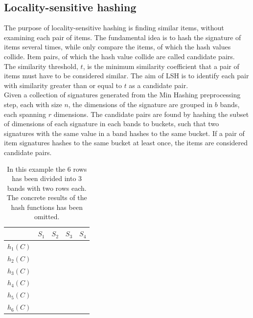 \subsection{Locality-sensitive hashing}
The purpose of locality-sensitive hashing is finding similar items, without examining each pair of items. The fundamental idea is to hash the signature of items several times, while only compare the items, of which the hash values collide. Item pairs, of which the hash value collide are called candidate pairs.\\

The similarity threshold, \(t\), is the minimum similarity coefficient that a pair of items must have to be considered similar. The aim of LSH is to identify each pair with similarity greater than or equal to \(t\) as a candidate pair.\\

Given a collection of signatures generated from the Min Hashing preprocessing step, each with size \(n\), the dimensions of the signature are grouped in \(b\) bands, each spanning \(r\) dimensions. The candidate pairs are found by hashing the subset of dimensions of each signature in each bands to buckets, such that two signatures with the same value in a band hashes to the same bucket. If a pair of item signatures hashes to the same bucket at least once, the items are considered candidate pairs.

\begin{table}[h]
\begin{tabular}{l||l|l|l|l}
& \(S_1\) & \(S_2\) & \(S_3\) & \(S_4\) \\ \hline \hline
\(h_1(C)\) & \cellcolor[HTML]{FD6864} & \cellcolor[HTML]{FD6864}
 & \cellcolor[HTML]{FD6864} & \cellcolor[HTML]{FD6864} \\ \hline
\(h_2(C)\) & \cellcolor[HTML]{FD6864} & \cellcolor[HTML]{FD6864}
 & \cellcolor[HTML]{FD6864} & \cellcolor[HTML]{FD6864} \\ \hline
\(h_3(C)\) & \cellcolor[HTML]{38FFF8} & \cellcolor[HTML]{38FFF8}
 & \cellcolor[HTML]{38FFF8} & \cellcolor[HTML]{38FFF8} \\ \hline
\(h_4(C)\) & \cellcolor[HTML]{38FFF8} & \cellcolor[HTML]{38FFF8}
 & \cellcolor[HTML]{38FFF8} & \cellcolor[HTML]{38FFF8} \\ \hline
\(h_5(C)\) & \cellcolor[HTML]{9AFF99} & \cellcolor[HTML]{9AFF99}
 & \cellcolor[HTML]{9AFF99} & \cellcolor[HTML]{9AFF99} \\ \hline
\(h_6(C)\) & \cellcolor[HTML]{9AFF99} & \cellcolor[HTML]{9AFF99}
 & \cellcolor[HTML]{9AFF99} & \cellcolor[HTML]{9AFF99}
\end{tabular}
\centering
\caption{In this example the 6 rows has been divided into 3 bands with two rows each. The concrete results of the hash functions has been omitted.}
\end{table}

